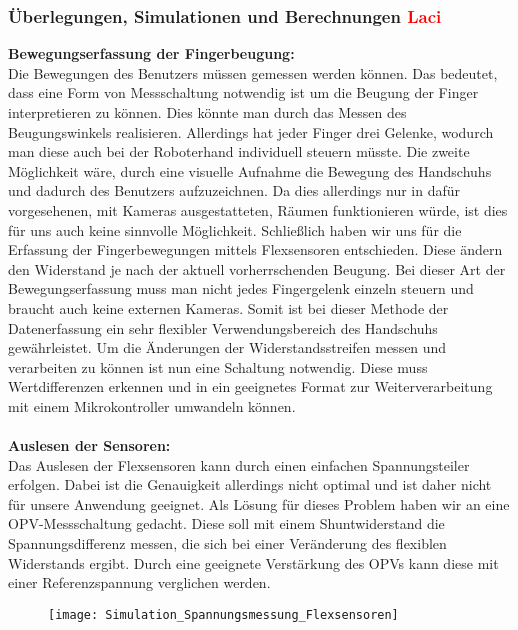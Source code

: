 \documentclass[11pt]{article}
\begin{document}
\subsubsection{Überlegungen, Simulationen und Berechnungen \textcolor{red}{Laci}}
\textbf{Bewegungserfassung der Fingerbeugung:}
\\
Die Bewegungen des Benutzers müssen gemessen werden können. Das bedeutet, dass eine Form von Messschaltung notwendig ist um die  
Beugung der Finger interpretieren zu können. Dies könnte man durch das Messen des Beugungswinkels realisieren. Allerdings hat 
jeder Finger drei Gelenke, wodurch man diese auch bei der Roboterhand individuell steuern müsste. Die zweite Möglichkeit wäre, 
durch eine visuelle Aufnahme die Bewegung des Handschuhs und dadurch des Benutzers aufzuzeichnen. Da dies allerdings nur in dafür vorgesehenen, 
mit Kameras ausgestatteten, Räumen funktionieren würde, ist dies für uns auch keine sinnvolle Möglichkeit. Schließlich haben 
wir uns für die Erfassung der Fingerbewegungen mittels Flexsensoren entschieden. Diese ändern den Widerstand je nach der 
aktuell vorherrschenden Beugung. Bei dieser Art der Bewegungserfassung muss man nicht jedes Fingergelenk einzeln steuern und 
braucht auch keine externen Kameras. Somit ist bei dieser Methode der Datenerfassung ein sehr flexibler Verwendungsbereich 
des Handschuhs gewährleistet. Um die Änderungen der Widerstandsstreifen messen und verarbeiten zu können ist nun eine Schaltung 
notwendig. Diese muss Wertdifferenzen erkennen und in ein geeignetes Format zur Weiterverarbeitung mit einem Mikrokontroller
umwandeln können.
\\
\\
\textbf{Auslesen der Sensoren:}
\\
Das Auslesen der Flexsensoren kann durch einen einfachen Spannungsteiler erfolgen. Dabei ist die Genauigkeit
allerdings nicht optimal und ist daher nicht für unsere Anwendung geeignet. Als Lösung für dieses Problem haben wir an eine 
OPV-Messschaltung gedacht. Diese soll mit einem Shuntwiderstand die Spannungsdifferenz messen, die sich bei einer Veränderung 
des flexiblen Widerstands ergibt. Durch eine geeignete Verstärkung des OPVs kann diese mit einer Referenzspannung verglichen 
werden. \\
\begin{figure}[H]
	\begin{center}
		\scalebox{0.8}
		{\texttt{[image: Simulation\_Spannungsmessung\_Flexsensoren]}}
	\end{center}
\end{figure}
\end{document}
